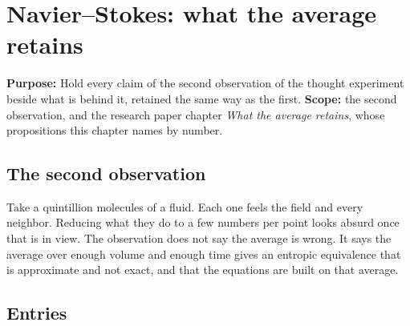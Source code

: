\chapter{Navier--Stokes: what the average retains}

\textbf{Purpose:} Hold every claim of the second observation of the thought experiment beside what
is behind it, retained the same way as the first. \textbf{Scope:} the second observation, and the
research paper chapter \emph{What the average retains}, whose propositions this chapter names by
number.

\section{The second observation}

Take a quintillion molecules of a fluid. Each one feels the field and every neighbor. Reducing
what they do to a few numbers per point looks absurd once that is in view. The observation does not
say the average is wrong. It says the average over enough volume and enough time gives an entropic
equivalence that is approximate and not exact, and that the equations are built on that average.

\section{Entries}

